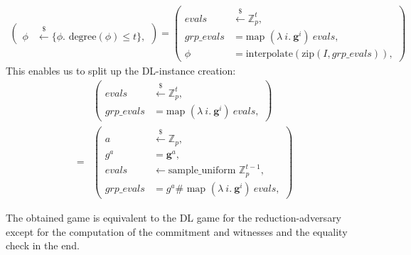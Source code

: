 \begin{equation*}
    \begin{aligned}
        \left(
        \begin{aligned}
            \phi & \overset{{\scriptscriptstyle\$}}{\leftarrow} \{\phi. \text{ degree}(\phi)\le t\},
        \end{aligned}
        \right)
        = \left(
            \begin{aligned}
                evals &\overset{{\scriptscriptstyle\$}}{\leftarrow} \mathbb{Z}_p^t, \\
                grp\_evals &= \text{map } (\lambda\ i. \ \mathbf{g}^i)\ evals,\\
                \phi &= \text{interpolate}(\text{zip}(I,grp\_evals)),
            \end{aligned}
            \right)
    \end{aligned}
\end{equation*}
This enables us to split up the DL-instance creation:
\begin{equation*}
    \begin{aligned}
        &\left(
            \begin{aligned}
                evals &\overset{{\scriptscriptstyle\$}}{\leftarrow} \mathbb{Z}_p^t, \\
                grp\_evals &= \text{map } (\lambda\ i. \ \mathbf{g}^i)\ evals,
            \end{aligned}
        \right)\\
        =&\left(
            \begin{aligned}
                a &\overset{{\scriptscriptstyle\$}}{\leftarrow} \mathbb{Z}_p,\\
                g^a &= \mathbf{g}^a,\\
                evals &\leftarrow \text{sample\_uniform } \mathbb{Z}_p^{t-1}, \\
                grp\_evals &= g^a\#\text{ map } (\lambda\ i. \ \mathbf{g}^i)\ evals,
            \end{aligned}
        \right)
    \end{aligned}
\end{equation*}

The obtained game is equivalent to the DL game for the reduction-adversary except for the computation of the commitment and witnesses and the equality check in the end. 

